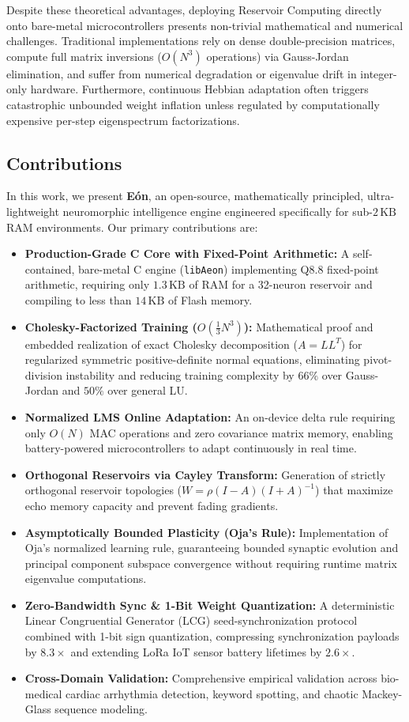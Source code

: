 Despite these theoretical advantages, deploying Reservoir Computing directly onto bare-metal microcontrollers presents non-trivial mathematical and numerical challenges. Traditional implementations rely on dense double-precision matrices, compute full matrix inversions ($O(N^3)$ operations) via Gauss-Jordan elimination, and suffer from numerical degradation or eigenvalue drift in integer-only hardware. Furthermore, continuous Hebbian adaptation often triggers catastrophic unbounded weight inflation unless regulated by computationally expensive per-step eigenspectrum factorizations.

\subsection{Contributions}
In this work, we present \textbf{Eón}, an open-source, mathematically principled, ultra-lightweight neuromorphic intelligence engine engineered specifically for sub-$2\,\text{KB}$ RAM environments. Our primary contributions are:
\begin{itemize}
    \item \textbf{Production-Grade C Core with Fixed-Point Arithmetic:} A self-contained, bare-metal C engine (\texttt{libAeon}) implementing Q8.8 fixed-point arithmetic, requiring only $1.3\,\text{KB}$ of RAM for a 32-neuron reservoir and compiling to less than $14\,\text{KB}$ of Flash memory.
    \item \textbf{Cholesky-Factorized Training ($O(\frac{1}{3} N^3)$):} Mathematical proof and embedded realization of exact Cholesky decomposition ($A = L L^T$) for regularized symmetric positive-definite normal equations, eliminating pivot-division instability and reducing training complexity by $66\%$ over Gauss-Jordan and $50\%$ over general LU.
    \item \textbf{Normalized LMS Online Adaptation:} An on-device delta rule requiring only $O(N)$ MAC operations and zero covariance matrix memory, enabling battery-powered microcontrollers to adapt continuously in real time.
    \item \textbf{Orthogonal Reservoirs via Cayley Transform:} Generation of strictly orthogonal reservoir topologies ($W = \rho (I - A)(I + A)^{-1}$) that maximize echo memory capacity and prevent fading gradients.
    \item \textbf{Asymptotically Bounded Plasticity (Oja's Rule):} Implementation of Oja's normalized learning rule, guaranteeing bounded synaptic evolution and principal component subspace convergence without requiring runtime matrix eigenvalue computations.
    \item \textbf{Zero-Bandwidth Sync \& 1-Bit Weight Quantization:} A deterministic Linear Congruential Generator (LCG) seed-synchronization protocol combined with 1-bit sign quantization, compressing synchronization payloads by $8.3\times$ and extending LoRa IoT sensor battery lifetimes by $2.6\times$.
    \item \textbf{Cross-Domain Validation:} Comprehensive empirical validation across bio-medical cardiac arrhythmia detection, keyword spotting, and chaotic Mackey-Glass sequence modeling.
\end{itemize}
